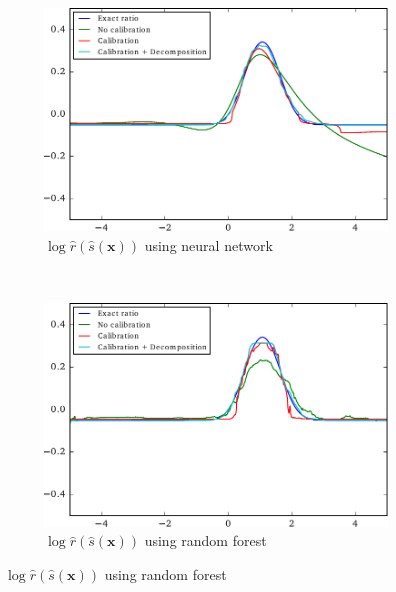 \documentclass[12pt]{article}
\numberwithin{equation}{section}
\theoremstyle{plain}
\begin{document}
\begin{figure}
    \vspace{1em}

    \begin{subfigure}[b]{0.4\textwidth}
        \includegraphics[width=\textwidth]{figures/fig1c.pdf}
        \caption{$\log \hat r(\hat{s}(\mathbf{x}))$ using neural network}
        \label{fig:1c}
    \end{subfigure}
    ~
    \begin{subfigure}[b]{0.4\textwidth}
        \includegraphics[width=\textwidth]{figures/fig1d.pdf}
        \caption{$\log \hat r(\hat{s}(\mathbf{x}))$ using random forest}
        \label{fig:1d}
    \end{subfigure}


\end{figure}
\end{document}
